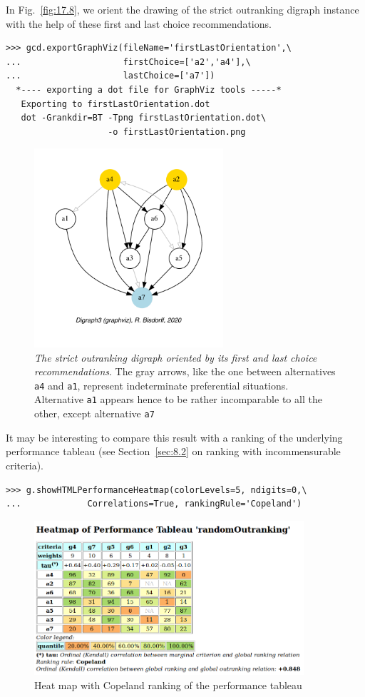 In Fig.~\vref{fig:17.8}, we orient the drawing of the strict outranking digraph instance with the help of these first and last choice recommendations. 
\begin{lstlisting}
>>> gcd.exportGraphViz(fileName='firstLastOrientation',\
...                    firstChoice=['a2','a4'],\
...                    lastChoice=['a7'])
  *---- exporting a dot file for GraphViz tools -----*
   Exporting to firstLastOrientation.dot
   dot -Grankdir=BT -Tpng firstLastOrientation.dot\
                    -o firstLastOrientation.png
\end{lstlisting}
\begin{figure}[ht]
\sidecaption[t]
\includegraphics[width=7cm]{Figures/17-8-bestWorstOrientation.pdf}
\caption[The strict outranking digraph oriented by its first and last choice recommendations]{\emph{The strict outranking digraph oriented by its first and last choice recommendations}. The gray arrows, like the one between alternatives \texttt{a4} and \texttt{a1}, represent indeterminate preferential situations. Alternative \texttt{a1} appears hence to be rather incomparable to all the other, except alternative \texttt{a7}}
\label{fig:17.8}       %
\end{figure}

It may be interesting to compare this result with a \Copeland ranking of the underlying performance tableau (see Section~\vref{sec:8.2} on ranking with incommensurable criteria).
\begin{lstlisting}
>>> g.showHTMLPerformanceHeatmap(colorLevels=5, ndigits=0,\
...             Correlations=True, rankingRule='Copeland')
\end{lstlisting}
\begin{figure}[ht]
\includegraphics[width=10cm]{Figures/17-9-outRankingResult.png}
\caption{Heat map with Copeland ranking of the performance tableau}
\label{fig:17.9}       %
\end{figure}

